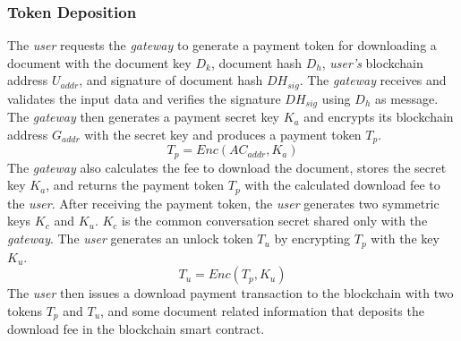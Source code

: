\documentclass[conference]{IEEEtran}
\begin{document}
\subsubsection{Token Deposition}
The {\it user} requests the {\it gateway} to generate a payment token for downloading a document with the document key $D_k$, document hash $D_h$, {\it user's} blockchain address $U_{addr}$, and signature of document hash $DH_{sig}$. The {\it gateway} receives and validates the input data and verifies the signature $DH_{sig}$ using $D_{h}$ as message. The {\it gateway} then generates a payment secret key $K_a$ and encrypts its blockchain address $G_{addr}$ with the secret key and produces a payment token $T_{p}$. 
\begin{equation}
\label{eq-d-1}
T_p = Enc (AC_{addr}, K_a)
\end{equation}
The {\it gateway} also calculates the fee to download the document, stores the secret key $K_a$, and returns the payment token $T_p$ with the calculated download fee to the {\it user}.
After receiving the payment token, the {\it user} generates two symmetric keys $K_c$ and $K_u$. $K_c$ is the common conversation secret shared only with the {\it gateway}. The {\it user} generates an unlock token $T_u$ by encrypting $T_p$ with the key $K_u$.
\begin{equation}
\label{eq-d-2}
T_u = Enc (T_p, K_u)
\end{equation}
The {\it user} then issues a download payment transaction to the blockchain with two tokens $T_p$ and $T_u$, and some document related information that deposits the download fee in the blockchain smart contract.
\end{document}
